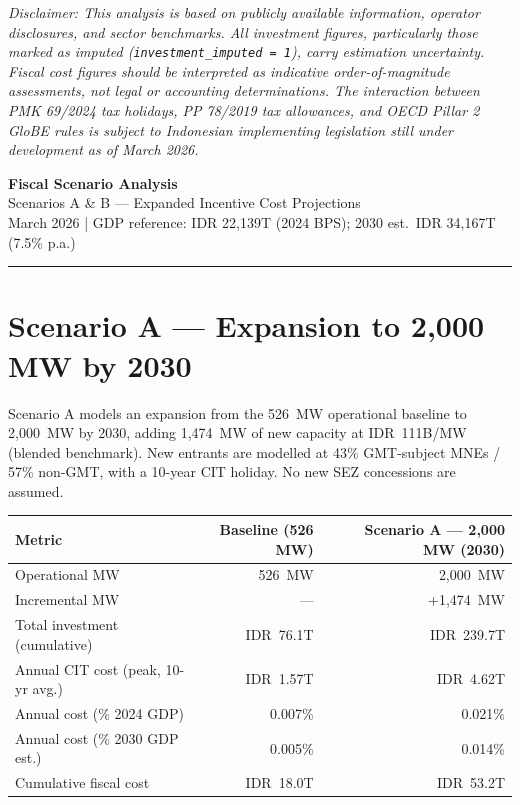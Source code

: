 \documentclass[a4paper,10pt]{article}
\begin{document}
\vspace{10pt}
\noindent\footnotesize\color{midgray}
\textit{Disclaimer: This analysis is based on publicly available information, operator disclosures, and sector benchmarks. All investment figures, particularly those marked as imputed (\texttt{investment\_imputed = 1}), carry estimation uncertainty. Fiscal cost figures should be interpreted as indicative order-of-magnitude assessments, not legal or accounting determinations. The interaction between PMK 69/2024 tax holidays, PP 78/2019 tax allowances, and OECD Pillar 2 GloBE rules is subject to Indonesian implementing legislation still under development as of March 2026.}

\clearpage


{\centering
  {\LARGE\bfseries\color{navy} Fiscal Scenario Analysis}\\[3pt]
  {\large\color{teal} Scenarios A \& B --- Expanded Incentive Cost Projections}\\[2pt]
  {\small\color{midgray} March 2026 | GDP reference: IDR 22,139T (2024 BPS); 2030 est.\ IDR 34,167T (7.5\% p.a.)}\\[6pt]
}
\noindent\color{navy}\rule{\linewidth}{1.5pt}

\vspace{8pt}

\section{Scenario A --- Expansion to 2,000 MW by 2030}

Scenario A models an expansion from the 526~MW operational baseline to 2,000~MW by 2030, adding 1,474~MW of new capacity at IDR~111B/MW (blended benchmark). New entrants are modelled at 43\% GMT-subject MNEs / 57\% non-GMT, with a 10-year CIT holiday. No new SEZ concessions are assumed.

\small
\begin{tabular}{lrr}
  \toprule
  \textbf{Metric} & \textbf{Baseline (526 MW)} & \textbf{Scenario A --- 2,000 MW (2030)} \\
  \midrule
  Operational MW                      & 526~MW      & 2,000~MW \\
  Incremental MW                      & ---         & +1,474~MW \\
  Total investment (cumulative)       & IDR~76.1T   & IDR~239.7T \\
  Annual CIT cost (peak, 10-yr avg.)  & IDR~1.57T   & IDR~4.62T \\
  Annual cost (\% 2024 GDP)           & 0.007\%     & 0.021\% \\
  Annual cost (\% 2030 GDP est.)      & 0.005\%     & 0.014\% \\
  Cumulative fiscal cost              & IDR~18.0T   & IDR~53.2T \\
  \bottomrule
\end{tabular}
\end{document}
